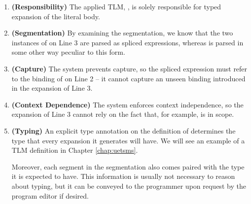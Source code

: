 \begin{enumerate}
\item \textbf{(Responsibility)} The applied TLM, , is solely responsible for typed expansion of the literal body. 
\item \textbf{(Segmentation)} By examining the segmentation, we know that the two instances of  on Line 3 are parsed as spliced expressions, whereas  is parsed in some other way peculiar to this form.
\item \textbf{(Capture)} The system prevents capture, so the spliced expression  must refer to the binding of  on Line 2 -- it cannot capture an unseen binding introduced in the expansion of Line 3.
\item \textbf{(Context Dependence)} The system enforces context independence, so the expansion of Line 3 cannot  rely on the fact that, for example,  is in scope.
\item \textbf{(Typing)} An explicit type annotation on the definition of  determines the type that every expansion it generates will have. We will see an example of a TLM definition in Chapter \ref{chap:uetsms}. 

Moreover, each segment in the segmentation also comes paired with the type it is expected to have. This information is usually not necessary to reason about typing, but it can be conveyed to the programmer upon request by the program editor if desired. %
\end{enumerate}





